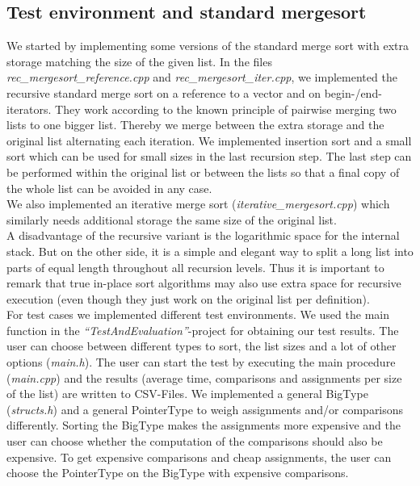 \documentclass[11pt,pdftex,a4paper, twocolumn]{article}
\begin{document}
\subsection*{Test environment and standard mergesort}
We started by implementing some versions of the standard merge sort with extra storage matching the size of the given list. In the files \textit{rec\_mergesort\_reference.cpp} and \textit{rec\_mergesort\_iter.cpp}, we implemented the recursive standard merge sort on a reference to a vector and on begin-/end-iterators. They work according to the known principle of pairwise merging two lists to one bigger list. Thereby we merge between the extra storage and the original list alternating each iteration. We implemented insertion sort and a small sort which can be used for small sizes in the last recursion step. The last step can be performed within the original list or between the lists so that a final copy of the whole list can be avoided in any case. \\
We also implemented an iterative merge sort (\textit{iterative\_mergesort.cpp}) which similarly needs additional storage the same size of the original list. \\
A disadvantage of the recursive variant is the logarithmic space for the internal stack. But on the other side, it is a simple and elegant way to split a long list into parts of equal length throughout all recursion levels. Thus it is important to remark that true in-place sort algorithms may also use extra space for recursive execution (even though they just work on the original list per definition). \\
For test cases we implemented different test environments. We used the main function in the \textit{“TestAndEvaluation”}-project for obtaining our test results. The user can choose between different types to sort, the list sizes and a lot of other options (\textit{main.h}). The user can start the test by executing the main procedure (\textit{main.cpp}) and the results (average time, comparisons and assignments per size of the list) are written to CSV-Files. We implemented a general BigType (\textit{structs.h}) and a general PointerType to weigh assignments and/or comparisons differently. Sorting the BigType makes the assignments more expensive and the user can choose whether the computation of the comparisons should also be expensive. To get expensive comparisons and cheap assignments, the user can choose the PointerType on the BigType with expensive comparisons.
\end{document}
